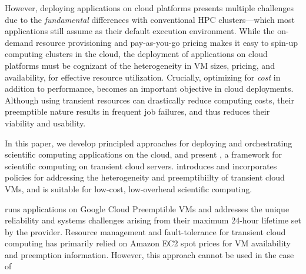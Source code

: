 
However, deploying applications on cloud platforms presents multiple challenges due to the \emph{fundamental} differences with conventional HPC clusters---which most applications still assume as their default execution environment.
While the on-demand resource provisioning and pay-as-you-go pricing makes it easy to spin-up computing clusters in the cloud, the deployment of applications on cloud platforms must be cognizant of the heterogeneity in VM sizes, pricing, and availability, for effective resource utilization. 
Crucially, optimizing for \emph{cost} in addition to performance, becomes an important objective in cloud deployments.
%
Although using transient resources can drastically reduce computing costs, their preemptible nature results in frequent job failures, and thus reduces their viability and usability. 
%



In this paper, we develop principled approaches for deploying and orchestrating  scientific computing applications on the cloud, and present \sysname, a framework for scientific computing on transient cloud servers.
%
\sysname introduces and incorporates policies for addressing the heterogeneity and preemptibiilty of transient cloud VMs, and is suitable for low-cost, low-overhead scientific computing.
%


\sysname runs applications on Google Cloud Preemptible VMs and addresses the unique reliability and systems challenges arising from their maximum 24-hour lifetime set by the provider. 
Resource management and fault-tolerance for transient cloud computing has primarily relied on Amazon EC2 spot prices for VM availability and preemption information. However, this approach cannot be used in the case of 


